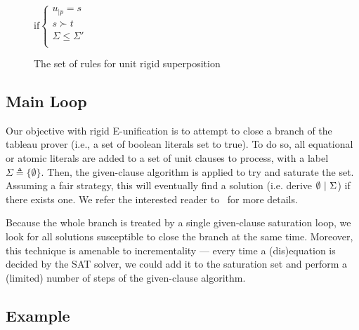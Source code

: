 \begin{figure}[htb]
\begin{center}
    \doubleLine{}
    \DP{}
    $\text{if} \left\{\begin{array}{l}
      u_{|p} = s \\
      s \succ t \\
      \Sigma \leq \Sigma'\\
    \end{array}\right.$

  \caption{The set of rules for unit rigid superposition}
  \label{fig:unit-sup-rules}
  \end{center}
\end{figure}

\subsection{Main Loop}

Our objective with rigid E-unification is to attempt to close a branch
of the tableau prover (i.e., a set of boolean literals set to true).
To do so, all equational or atomic literals are added to a set of unit clauses
to process, with a label $\Sigma \triangleq \{ \emptyset \}$.
Then, the given-clause algorithm is applied to try and saturate the set.
Assuming a fair strategy, this will eventually find a solution
(i.e. derive $\emptyset  ~|~ \Sigma$) if there exists one.
We refer the interested reader to~\cite{e_brainiac_prover} for more details.

Because the whole branch is treated by a single given-clause saturation loop,
we look for all solutions susceptible to close the branch at the same time.
Moreover, this technique is amenable to incrementality --- every time a
(dis)equation is decided by the SAT solver, we could add it to the saturation
set and perform a (limited) number of steps of the given-clause algorithm.

\subsection{Example}

